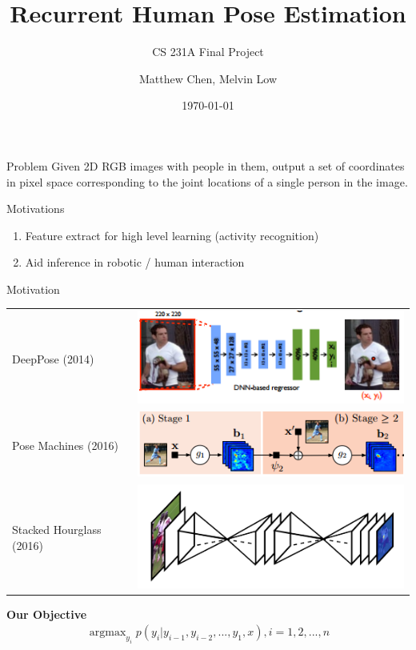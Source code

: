 \documentclass[10pt]{beamer}
\title{Recurrent Human Pose Estimation}
\subtitle{CS 231A Final Project}
\date{\today}
\author{Matthew Chen, Melvin Low}
\institute{Stanford University}
\DeclareMathOperator*{\argmax}{argmax} %
\begin{document}
\maketitle


\begin{frame}[fragile]{Problem}
Given 2D RGB images with people in them, output a set of coordinates in pixel space corresponding to the joint locations of a single person in the image.

\vspace{10mm}
Motivations
\begin{enumerate}
\item Feature extract for high level learning (activity recognition)
\item Aid inference in robotic / human interaction
\end{enumerate}
\end{frame}

\begin{frame}{Motivation}

\begin{tabular}{l l}
DeepPose (2014)	&\includegraphics[scale=0.4]{../images/deeppose.png}\\
Pose Machines (2016) &\includegraphics[scale=0.4]{../images/posemachines.png}\\
Stacked Hourglass (2016) &\includegraphics[scale=0.4]{../images/stackedhourglass.png}\\

\end{tabular}

\vspace{10mm}
\textbf{Our Objective}
\begin{align*}
\argmax_{y_i} p(y_i | y_{i-1}, y_{i-2},...,y_1, x), i = 1, 2,...,n
\end{align*}

\end{frame}
\end{document}

